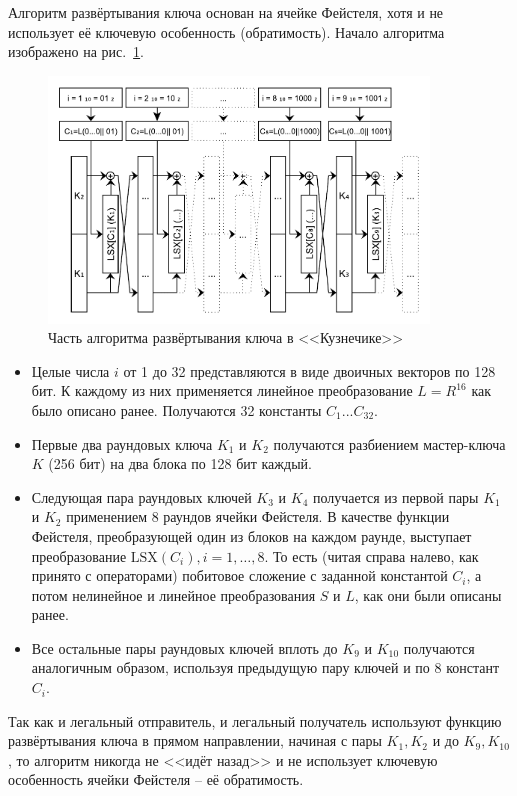 Алгоритм развёртывания ключа основан на ячейке Фейстеля, хотя и не использует её ключевую особенность (обратимость). Начало алгоритма изображено на рис.~\ref{fig:kuznechik-keys}.

\begin{figure}[htb]
	\centering
	\includegraphics[width=0.90\textwidth]{pic/kuznechik-keys}
  \caption{Часть алгоритма развёртывания ключа в <<Кузнечике>>}
  \label{fig:kuznechik-keys}
\end{figure}

\begin{itemize}
	\item Целые числа $i$ от 1 до 32 представляются в виде двоичных векторов по 128 бит. К каждому из них применяется линейное преобразование $L=R^{16}$ как было описано ранее. Получаются 32 константы $C_{1}...C_{32}$.
	\item Первые два раундовых ключа $K_1$ и $K_2$ получаются разбиением мастер-ключа $K$ (256 бит) на два блока по 128 бит каждый.
	\item Следующая пара раундовых ключей $K_3$ и $K_4$ получается из первой пары $K_1$ и $K_2$ применением 8 раундов ячейки Фейстеля. В качестве функции Фейстеля, преобразующей один из блоков на каждом раунде, выступает преобразование $\text{LSX}(C_i), i=1,\dots,8$. То есть (читая справа налево, как принято с операторами) побитовое сложение с заданной константой $C_i$, а потом нелинейное и линейное преобразования $S$ и $L$, как они были описаны ранее.
	\item Все остальные пары раундовых ключей вплоть до $K_{9}$ и $K_{10}$ получаются аналогичным образом, используя предыдущую пару ключей и по 8 констант $C_i$.
\end{itemize}

Так как и легальный отправитель, и легальный получатель используют функцию развёртывания ключа в прямом направлении, начиная с пары $K_1, K_2$ и до $K_{9}, K_{10}$, то алгоритм никогда не <<идёт назад>> и не использует ключевую особенность ячейки Фейстеля -- её обратимость.


